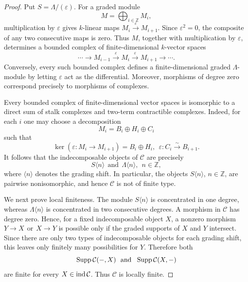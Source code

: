 \documentclass[11pt, twoside]{article}
\def\C{\mathcal{C}}
\numberwithin{equation}{section}
\begin{document}
\begin{proof}
Put
$
 S=\Lambda/(\varepsilon).
$
For a graded module
\[
 M=\bigoplus_{i\in\mathbb Z}M_i,
\]
multiplication by $\varepsilon$ gives $k$-linear maps
$
 M_i\xrightarrow{\ \varepsilon\ }M_{i+1}.
$
Since $\varepsilon^2=0$, the composite of any two consecutive maps is
zero.  Thus $M$, together with multiplication by $\varepsilon$, determines
a bounded complex of finite-dimensional $k$-vector spaces
\[
 \cdots\longrightarrow M_{i-1}
 \xrightarrow{\ \varepsilon\ }M_i
 \xrightarrow{\ \varepsilon\ }M_{i+1}
 \longrightarrow\cdots.
\]
Conversely, every such bounded complex defines a finite-dimensional graded
$\Lambda$-module by letting $\varepsilon$ act as the differential.
Moreover, morphisms of degree zero correspond precisely to morphisms of
complexes.

Every bounded complex of finite-dimensional vector spaces is isomorphic
to a direct sum of stalk complexes and two-term contractible complexes.
Indeed, for each $i$ one may choose a decomposition
\[
 M_i=B_i\oplus H_i\oplus C_i
\]
such that
\[
 \ker(\varepsilon\colon M_i\to M_{i+1})=B_i\oplus H_i,
~~
 \varepsilon\colon C_i\xrightarrow{\sim}B_{i+1}.
\]
It follows that the indecomposable objects of $\C$ are precisely
\[
 S\langle n\rangle
 ~~\text{and}~~
 \Lambda\langle n\rangle,
 ~~ n\in\mathbb Z,
\]
where $\langle n\rangle$ denotes the grading shift.  In particular,
the objects $S\langle n\rangle$, $n\in\mathbb Z$, are pairwise
nonisomorphic, and hence $\C$ is not of finite type.

We next prove local finiteness.  The module $S\langle n\rangle$ is
concentrated in one degree, whereas $\Lambda\langle n\rangle$ is
concentrated in two consecutive degrees.  A morphism in $\C$ has degree
zero.  Hence, for a fixed indecomposable object $X$, a nonzero morphism
$
 Y\longrightarrow X
 ~~\text{or}~~
 X\longrightarrow Y
$
is possible only if the graded supports of $X$ and $Y$ intersect.
Since there are only two types of indecomposable objects for each grading
shift, this leaves only finitely many possibilities for $Y$.  Therefore
both
\[
 \Supp\C(-,X)
~~\text{and}~~
 \Supp\C(X,-)
\]
are finite for every $X\in\ind\C$.  Thus $\C$ is locally finite.


\end{proof}
\end{document}
